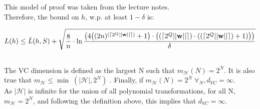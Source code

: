 \documentclass{scrartcl}
\begin{document}
This model of proof was taken from the lecture notes. \cite[p. 19]{mln} \\

Therefore, the bound on $h$, w.p. at least $ 1 - \delta$ is:

\[
    L(h) \leq \hat{L} (h, S) +
    \sqrt {
        \frac {8} {n} \cdot \ln
        \frac { \big(
        4 \big(
            ( 2n )^{(\lceil 2^Q || {\mathbf w} ||\rceil)} + 1
        \big)
        \cdot
        \big( {(\lceil 2^Q || {\mathbf w} ||\rceil)} \cdot ({(\lceil 2^Q || {\mathbf w} ||\rceil)} + 1) \big)
        \big) } {\delta}
    }
\]


\subsection{}

%
%
%

The VC dimension is defined as the largest N such that $m_\mathcal{H} (N) = 2^N.$
It is also true that $m_\mathcal{H} \leq \min \; (|\mathcal{H}|, 2^N)$
\cite[Home Assignment 5.2.1]{mla}. Finally, if $m_\mathcal{H} (N) = 2^N \; \forall_N, d_{VC} = \infty$. \cite[def. 2.5, p.50]{abu}\\

As $|\mathcal{H}|$ is infinite for the union of all polynomial transformations, for all N, $m_\mathcal{H} = 2^N$, and following the definition above, this implies that $d_{VC} = \infty$.

\subsection{}

\newpage
\printbibliography
\end{document}
